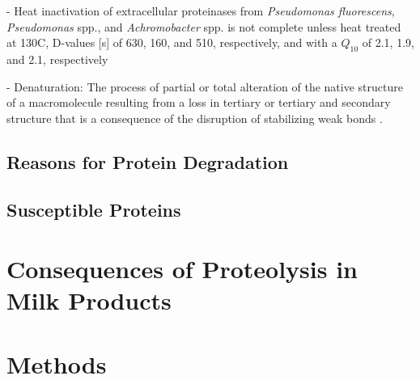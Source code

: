 - Heat inactivation of extracellular proteinases from \textit{Pseudomonas fluorescens}, \textit{Pseudomonas} spp., and \textit{Achromobacter} spp. is not complete unless heat treated at 130\textdegree C, D-values [s] of 630, 160, and 510, respectively, and with a $Q_{10}$ of 2.1, 1.9, and 2.1, respectively \cite*{s01_heat_treatment_1}

- Denaturation: The process of partial or total alteration of the native structure of a macromolecule resulting from a loss in tertiary or tertiary and secondary structure that is a consequence of the disruption of stabilizing weak bonds \cite*{s02_heat_treatment_2}.



\subsection{Reasons for Protein Degradation}


\subsection{Susceptible Proteins}


\section{Consequences of Proteolysis in Milk Products}







\section{Methods}

